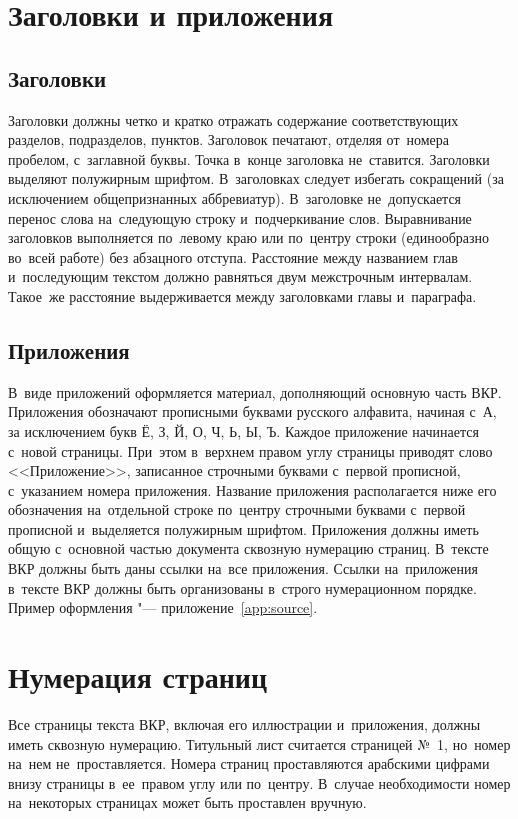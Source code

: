 \documentclass[a4paper,14pt]{diplom}
\begin{document}
\section{Заголовки и приложения}

\subsection{Заголовки}
Заголовки должны четко и кратко отражать содержание соответствующих разделов, подразделов, пунктов.
Заголовок печатают, отделяя от~номера пробелом, с~заглавной буквы. Точка в~конце заголовка не~ставится.
Заголовки выделяют полужирным шрифтом.
В~заголовках следует избегать сокращений (за исключением общепризнанных аббревиатур). В~заголовке не~допускается перенос слова на~следующую строку и~подчеркивание слов.
Выравнивание заголовков выполняется по~левому краю или по~центру строки (единообразно во~всей работе) без абзацного отступа.
Расстояние между названием глав и~последующим текстом должно равняться двум межстрочным интервалам. Такое~же расстояние выдерживается между заголовками главы и~параграфа.

\subsection{Приложения}
В~виде приложений оформляется материал, дополняющий основную часть ВКР.
Приложения обозначают прописными буквами русского алфавита, начиная с~А, за исключением букв Ё, З, Й, О, Ч, Ь, Ы, Ъ.
Каждое приложение начинается с~новой страницы.  При~этом в~верхнем правом углу страницы приводят слово <<Приложение>>, записанное строчными буквами с~первой прописной, с~указанием номера приложения.
Название приложения располагается ниже его обозначения на~отдельной строке по~центру  строчными буквами с~первой прописной и~выделяется полужирным шрифтом.
Приложения должны иметь общую с~основной частью документа сквозную нумерацию страниц.
В~тексте ВКР должны быть даны ссылки на~все приложения.
Ссылки на~приложения в~тексте ВКР должны быть организованы в~строго нумерационном порядке.
Пример оформления "--- приложение~\ref{app:source}.

\section{Нумерация страниц}
Все страницы текста ВКР, включая его иллюстрации и~приложения, должны иметь сквозную нумерацию.
Титульный лист считается страницей №~1, но~номер на~нем не~проставляется.
Номера страниц проставляются арабскими цифрами внизу страницы в~ее~правом углу или по~центру. В~случае необходимости номер на~некоторых страницах может быть проставлен вручную.
\end{document}
